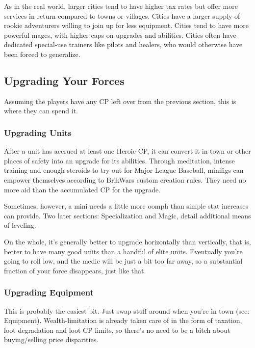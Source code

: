 \documentclass[12pt,a4paper,twocolumn]{article}
\begin{document}
As in the real world, larger cities tend to have higher tax rates but offer more services in return compared to towns or villages.  Cities have a larger supply of rookie adventurers willing to join up for less equipment.  Cities tend to have more powerful mages, with higher caps on upgrades and abilities.  Cities often have dedicated special-use trainers like pilots and healers, who would otherwise have been forced to generalize.

\subsection{Upgrading Your Forces}

Assuming the players have any CP left over from the previous section, this is where they can spend it.

\subsubsection{Upgrading Units}

After a unit has accrued at least one Heroic CP, it can convert it in town or other places of safety into an upgrade for its abilities.  Through meditation, intense training and enough steroids to try out for Major League Baseball, minifigs can empower themselves according to BrikWars custom creation rules.  They need no more aid than the accumulated CP for the upgrade. 

Sometimes, however, a mini needs a little more oomph than simple stat increases can provide.  Two later sections: Specialization and Magic, detail additional means of leveling.

On the whole, it's generally better to upgrade horizontally than vertically, that is, better to have many good units than a handful of elite units.  Eventually you're going to roll low, and the medic will be just a bit too far away, so a substantial fraction of your force disappears, just like that.

\subsubsection{Upgrading Equipment}

This is probably the easiest bit.  Just swap stuff around when you're in town (see: Equipment).  Wealth-limitation is already taken care of in the form of taxation, loot degradation and loot CP limits, so there's no need to be a bitch about buying/selling price disparities.
\end{document}
